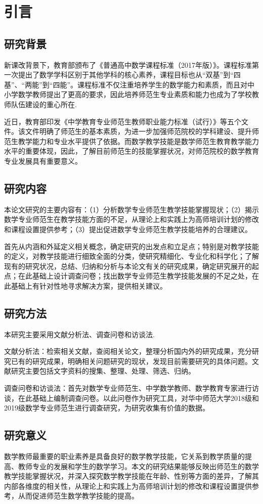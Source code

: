 \chapter{引言}


\section{研究背景}

新课改背景下，教育部颁布了《普通高中数学课程标准（2017年版）》。课程标准第一次提出了数学学科区别于其他学科的核心素养，课程目标也从“双基”到“四基”、“两能”到“四能”。课程标准不仅注重培养学生的数学能力和素质，而且对中小学数学教师提出了更高的要求，因此培养师范生专业素质和能力也成为了学校教师队伍建设的重心所在.

近日，教育部印发《中学教育专业师范生教师职业能力标准（试行）》等五个文件。该文件明确了师范生的基本素质，为进一步加强师范院校的学科建设、提升师范生教学能力和专业水平提供了依据。而数学教学技能是数学师范生教育教学能力水平的重要体现，因此，了解目前师范生的技能掌握状况，对师范院校的数学教育专业发展具有重要意义。



\section{研究内容}

本论文研究的主要内容有：（1）分析数学专业师范生教学技能掌握现状；（2）揭示数学专业师范生在教学技能方面的不足，从理论上和实践上为高师培训计划的修改和课程设置提供参考；（3）提出促进数学专业师范生教学技能培养的合理建议。

首先从内涵和外延定义相关概念，确定研究的出发点和立足点；特别是对教学技能的定义，对教学技能进行细致全面的分类，使研究精细化、专业化和科学化；了解现有的研究状况，总结、归纳和分析与本论文有关的研究成果，确定研究展开的起点；在此基础上设计调查问卷；找出数学专业师范生教学技能发展的不足之处，在此基础上有针对性地寻求解决方案，提供相关建议。



\section{研究方法}

本研究主要采用文献分析法、调查问卷和访谈法.

文献分析法：检索相关文献，查阅相关论文，整理分析国内外的研究成果，充分研究已有的研究成果，明确相关问题研究的现状，发现目前需要研究的具体问题。文献研究主要包括文字资料的搜集、整理、处理、筛选、归纳。

调查问卷和访谈法：首先对数学专业师范生、中学数学教师、数学教育专家进行访谈，在此基础上编制调查问卷。以此问卷作为研究工具，对华中师范大学2018级和2019级数学专业师范生进行调查研究，为研究收集有价值的数据。



\section{研究意义}

数学教师最重要的职业素养是具备良好的数学教学技能，它关系到教学质量的提高、教师专业的发展和学生的数学学习。本文的研究结果能够反映出师范生的数学教学技能掌握状况，并深入探究数学教学技能在年龄、性别等方面的差异，了解其内部各维度的相关性，从理论上和实践上为高师培训计划的修改和课程设置提供参考，从而促进师范生数学教学技能的提高。